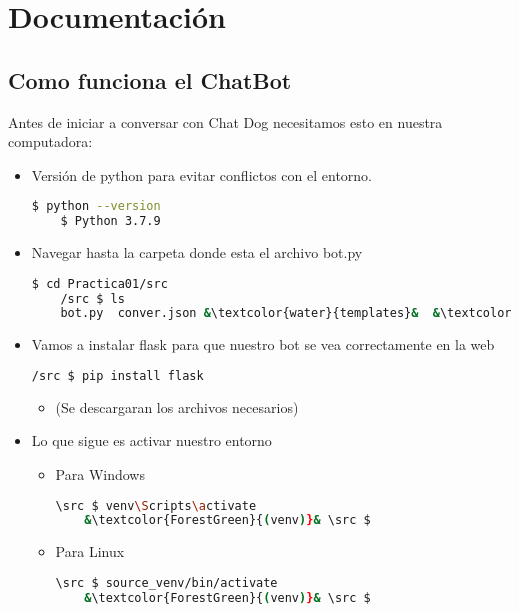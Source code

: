 \documentclass[a4paper,12pt]{article}
\begin{document}


\newpage
\section*{Documentación}
\subsection*{Como funciona el ChatBot}

Antes de iniciar a conversar con Chat Dog necesitamos esto en nuestra computadora:
\begin{itemize}
    \item Versión de python para evitar conflictos con el entorno.
\begin{lstlisting}[language=bash]
    $ python --version
    $ Python 3.7.9    
\end{lstlisting}

\item Navegar hasta la carpeta donde esta el archivo bot.py    
\begin{lstlisting}[language=bash]
    $ cd Practica01/src
    /src $ ls 
    bot.py  conver.json &\textcolor{water}{templates}&  &\textcolor{water}{nenv}&
\end{lstlisting}

\item Vamos a instalar flask para que nuestro bot se vea correctamente en la web
\begin{lstlisting}[language=bash]    
    /src $ pip install flask
\end{lstlisting}
\begin{itemize}
    \item (Se descargaran los archivos necesarios)
\end{itemize}

\item Lo que sigue es activar nuestro entorno 
\begin{itemize}
    \item Para Windows
\begin{lstlisting}[language=bash]    
    \src $ venv\Scripts\activate
    &\textcolor{ForestGreen}{(venv)}& \src $
\end{lstlisting}
\item Para Linux
\begin{lstlisting}[language=bash]    
    \src $ source_venv/bin/activate
    &\textcolor{ForestGreen}{(venv)}& \src $
\end{lstlisting}


\end{itemize}
\end{itemize}
\end{document}
